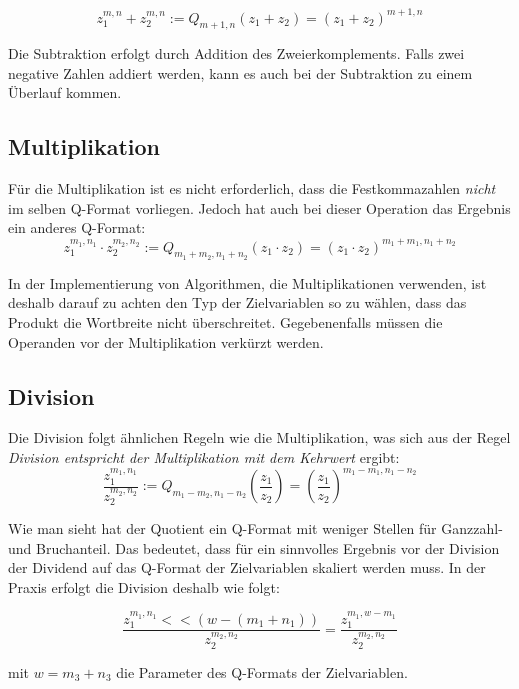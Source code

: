 \[z_1^{m,n}+z_2^{m,n} := Q_{m+1,n}(z_1+z_2) = (z_1+z_2)^{m+1,n}\]

Die Subtraktion erfolgt durch Addition des Zweierkomplements. Falls zwei negative Zahlen addiert werden, kann es auch bei der Subtraktion zu einem Überlauf kommen.

\subsection{Multiplikation}
Für die Multiplikation ist es nicht erforderlich, dass die Festkommazahlen \emph{nicht} im selben Q-Format vorliegen. Jedoch hat auch bei dieser Operation das Ergebnis ein anderes Q-Format:
\[z_1^{m_1,n_1}\cdot z_2^{m_2,n_2} := Q_{m_1+m_2,n_1+n_2}(z_1\cdot z_2) = (z_1\cdot z_2)^{m_1+m_1,n_1+n_2}\]

In der Implementierung von Algorithmen, die Multiplikationen verwenden, ist deshalb darauf zu achten den Typ der Zielvariablen so zu wählen, dass das Produkt die Wortbreite nicht überschreitet. Gegebenenfalls müssen die Operanden vor der Multiplikation verkürzt werden.

\subsection{Division}
Die Division folgt ähnlichen Regeln wie die Multiplikation, was sich aus der Regel \emph{Division entspricht der Multiplikation mit dem Kehrwert} ergibt:
\[\frac{z_1^{m_1,n_1}}{z_2^{m_2,n_2}} := Q_{m_1-m_2,n_1-n_2}\left(\frac{z_1}{z_2}\right) = \left(\frac{z_1}{z_2}\right)^{m_1-m_1,n_1-n_2}\]

Wie man sieht hat der Quotient ein Q-Format mit weniger Stellen für Ganzzahl- und Bruchanteil. Das bedeutet, dass für ein sinnvolles Ergebnis vor der Division der Dividend auf das Q-Format der Zielvariablen skaliert werden muss. In der Praxis erfolgt die Division deshalb wie folgt:

\[\frac{z_1^{m_1,n_1}<<(w-(m_1+n_1))}{z_2^{m_2,n_2}} = \frac{z_1^{m_1,w-m_1}}{z_2^{m_2,n_2}} \]

mit $w=m_3+n_3$ die Parameter des Q-Formats der Zielvariablen.